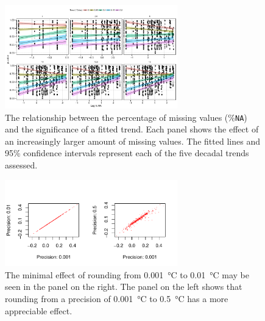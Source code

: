 \documentclass[]{ametsoc}
\begin{document}
\begin{figure}
\centering \includegraphics[width=7.5cm]{figure06}
\caption[\small The relationship between the percentage of missing values (\%\texttt{NA}) and the significance of a fitted trend]{The relationship between the percentage of missing values (\%\texttt{NA}) and the significance of a fitted trend. Each panel shows the effect of an increasingly larger amount of missing values. The fitted lines and 95\% confidence intervals represent each of the five decadal trends assessed.}
\label{figure06}
\end{figure}

\begin{figure}
\centering \includegraphics[width=7.5cm]{figure07}
\caption[\small The minimal effect of rounding from]{The minimal effect of rounding from \SI{0.001}{\degreeCelsius} to \SI{0.01}{\degreeCelsius} may be seen in the panel on the right. The panel on the left shows that rounding from a precision of \SI{0.001}{\degreeCelsius} to \SI{0.5}{\degreeCelsius} has a more appreciable effect.}
\label{figure07}
\end{figure}
\end{document}
